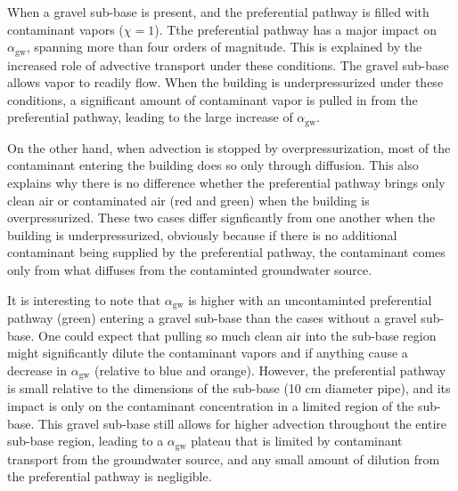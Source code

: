 \documentclass[journal=esthag,manuscript=article]{achemso}
\begin{document}
When a gravel sub-base is present, and the preferential pathway is filled with contaminant vapors ($\chi=1$).
Tthe preferential pathway has a major impact on $\alpha_\mathrm{gw}$, spanning more than four orders of magnitude.
This is explained by the increased role of advective transport under these conditions.
The gravel sub-base allows vapor to readily flow.
When the building is underpressurized under these conditions, a significant amount of contaminant vapor is pulled in from the preferential pathway, leading to the large increase of $\alpha_\mathrm{gw}$.\par

On the other hand, when advection is stopped by overpressurization, most of the contaminant entering the building does so only through diffusion.
This also explains why there is no difference whether the preferential pathway brings only clean air or contaminated air (red and green) when the building is overpressurized.
These two cases differ signficantly from one another when the building is underpressurized, obviously because if there is no additional contaminant being supplied by the preferential pathway, the contaminant comes only from what diffuses from the contaminted groundwater source.\par

It is interesting to note that $\alpha_\mathrm{gw}$ is higher with an uncontaminted preferential pathway (green) entering a gravel sub-base than the cases without a gravel sub-base.
One could expect that pulling so much clean air into the sub-base region might significantly dilute the contaminant vapors and if anything cause a decrease in $\alpha_\mathrm{gw}$ (relative to blue and orange).
However, the preferential pathway is small relative to the dimensions of the sub-base (10 cm diameter pipe), and its impact is only on the contaminant concentration in a limited region of the sub-base.
This gravel sub-base still allows for higher advection throughout the entire sub-base region, leading to a $\alpha_\mathrm{gw}$ plateau that is limited by contaminant transport from the groundwater source, and any small amount of dilution from the preferential pathway is negligible.\par
\end{document}
